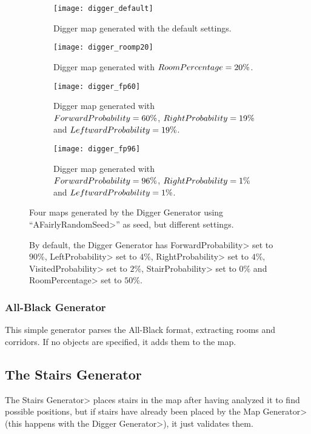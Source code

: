 \begin{figure}[tp]
\centering
\begin{subfigure}[t]{0.48\linewidth}
\texttt{[image: digger\_default]}
\caption{Digger map generated with the default settings.}
\end{subfigure}
\begin{subfigure}[t]{0.48\linewidth}
\texttt{[image: digger\_roomp20]}
\caption{Digger map generated with $Room\-Per\-cent\-age = 20\%$.}
\end{subfigure}
\begin{subfigure}[t]{0.48\linewidth}
\texttt{[image: digger\_fp60]}
\caption{Digger map generated with $For\-ward\-Prob\-a\-bil\-i\-ty = 60\%$, $Right\-Prob\-a\-bil\-i\-ty = 19\%$ and $Left\-ward\-Prob\-a\-bil\-i\-ty = 19\%$.}
\end{subfigure}
\begin{subfigure}[t]{0.48\linewidth}
\texttt{[image: digger\_fp96]}
\caption{Digger map generated with $For\-ward\-Prob\-a\-bil\-i\-ty = 96\%$, $Right\-Prob\-a\-bil\-i\-ty = 1\%$ and $Left\-ward\-Prob\-a\-bil\-i\-ty = 1\%$.}
\end{subfigure}
\caption{Four maps generated by the Digger Generator using ``\<AFairlyRandomSeed>'' as seed, but different settings.}
\caption*{By default, the Digger Generator has \<For\-ward\-Prob\-a\-bil\-i\-ty> set to $90\%$, \<Left\-Prob\-a\-bil\-i\-ty> set to $4\%$, \<Right\-Prob\-a\-bil\-i\-ty> set to $4\%$, \<Vis\-it\-ed\-Prob\-a\-bil\-i\-ty> set to $2\%$, \<Stair\-Prob\-a\-bil\-i\-ty> set to $0\%$ and \<Room\-Per\-cent\-age> set to $50\%$.}
\label{fig:diggers}
\end{figure}


\subsubsection{All-Black Generator}

This simple generator parses the All-Black format, extracting rooms and corridors. If no objects are specified, it adds them to the map.


\subsection{The Stairs Generator}

The \<Stairs Generator> places stairs in the map after having analyzed it to find possible positions, but if stairs have already been placed by the \<Map Generator> (this happens with the \<Digger Generator>), it just validates them.

